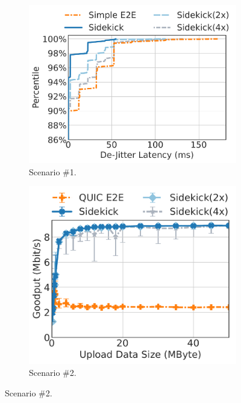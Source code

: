 \begin{figure}
\begin{subfigure}{0.34\textwidth}
\includegraphics[width=\linewidth]{sidekick/figures/fig4a_low_latency_media_quack.pdf}
\caption{Scenario \#1.}
\label{fig:sidekick:quack-interval:media}
\end{subfigure}
\hfill
\begin{subfigure}{0.31\textwidth}
\includegraphics[width=0.97\linewidth]{sidekick/figures/fig4b_pep_emulation_quack.pdf}
\caption{Scenario \#2.
}
\label{fig:sidekick:quack-interval:pep-emulation}
\end{subfigure}

\end{figure}
